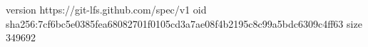 version https://git-lfs.github.com/spec/v1
oid sha256:7cf6bc5e0385fea68082701f0105cd3a7ae08f4b2195c8c99a5bdc6309c4ff63
size 349692
